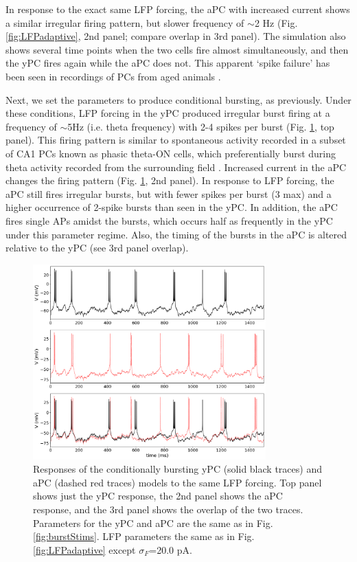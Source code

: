 \documentclass[12pt]{article}
\begin{document}
In response to the exact same LFP forcing, the aPC with increased {\Ca} current shows a similar irregular firing pattern, but slower frequency of $\sim$2 Hz (Fig. \ref{fig:LFPadaptive}, 2nd panel; compare overlap in 3rd panel). The simulation also shows several time points when the two cells fire almost simultaneously, and then the yPC fires again while the aPC does not. This apparent `spike failure' has been seen in recordings of PCs from aged animals \citep{gant2009action}. 

Next, we set the parameters to produce conditional bursting, as previously. Under these conditions, LFP forcing in the yPC produced irregular burst firing at a frequency of $\sim$5Hz (i.e. theta frequency) with 2-4 spikes per burst (Fig. \ref{fig:LFPbursting}, top panel). This firing pattern is similar to spontaneous activity recorded in a subset of CA1 PCs known as phasic theta-ON cells, which preferentially burst during theta activity recorded from the surrounding field \citep{bland2005heterogeneity,colom1987state}. Increased {\Ca} current in the aPC changes the firing pattern (Fig. \ref{fig:LFPbursting}, 2nd panel). In response to LFP forcing, the aPC still fires irregular bursts, but with fewer spikes per burst (3 max) and a higher occurrence of 2-spike bursts than seen in the yPC. In addition, the aPC fires single APs amidst the bursts, which occurs half as frequently in the yPC under this parameter regime. Also, the timing of the bursts in the aPC is altered relative to the yPC (see 3rd panel overlap).

\begin{figure}[h!]
\centering
\includegraphics[width=0.8\textwidth]{figures/fig6.png}
\caption{Responses of the conditionally bursting yPC (solid black traces) and aPC (dashed red traces) models to the same LFP forcing. Top panel shows just the yPC response, the 2nd panel shows the aPC response, and the 3rd panel shows the overlap of the two traces. Parameters for the yPC and aPC are the same as in Fig. \ref{fig:burstStims}. LFP parameters the same as in Fig. \ref{fig:LFPadaptive} except $\sigma_{F}$=20.0 pA.}
\label{fig:LFPbursting}
\end{figure}
\end{document}

